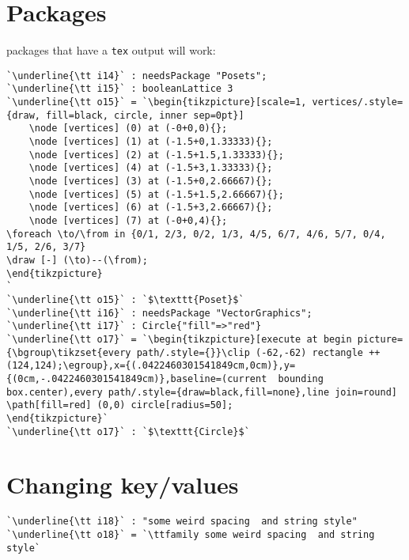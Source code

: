 \documentclass[12pt,a4paper]{amsart}
\begin{document}
\section{Packages}
packages that have a {\tt tex} output will work:
\begin{lstlisting}[language=Macaulay2output]
`\underline{\tt i14}` : needsPackage "Posets";
`\underline{\tt i15}` : booleanLattice 3
`\underline{\tt o15}` = `\begin{tikzpicture}[scale=1, vertices/.style={draw, fill=black, circle, inner sep=0pt}]
	\node [vertices] (0) at (-0+0,0){};
	\node [vertices] (1) at (-1.5+0,1.33333){};
	\node [vertices] (2) at (-1.5+1.5,1.33333){};
	\node [vertices] (4) at (-1.5+3,1.33333){};
	\node [vertices] (3) at (-1.5+0,2.66667){};
	\node [vertices] (5) at (-1.5+1.5,2.66667){};
	\node [vertices] (6) at (-1.5+3,2.66667){};
	\node [vertices] (7) at (-0+0,4){};
\foreach \to/\from in {0/1, 2/3, 0/2, 1/3, 4/5, 6/7, 4/6, 5/7, 0/4, 1/5, 2/6, 3/7}
\draw [-] (\to)--(\from);
\end{tikzpicture}
`
`\underline{\tt o15}` : `$\texttt{Poset}$`
`\underline{\tt i16}` : needsPackage "VectorGraphics";
`\underline{\tt i17}` : Circle{"fill"=>"red"}
`\underline{\tt o17}` = `\begin{tikzpicture}[execute at begin picture={\bgroup\tikzset{every path/.style={}}\clip (-62,-62) rectangle ++(124,124);\egroup},x={(.0422460301541849cm,0cm)},y={(0cm,-.0422460301541849cm)},baseline=(current  bounding  box.center),every path/.style={draw=black,fill=none},line join=round]
\path[fill=red] (0,0) circle[radius=50];
\end{tikzpicture}`
`\underline{\tt o17}` : `$\texttt{Circle}$`
\end{lstlisting}

\section{Changing key/values}
\begin{lstlisting}[showstringspaces=true,language=Macaulay2output,basewidth={1.5ex}]
`\underline{\tt i18}` : "some weird spacing  and string style"
`\underline{\tt o18}` = `\ttfamily some weird spacing  and string style`
\end{lstlisting}
\end{document}
